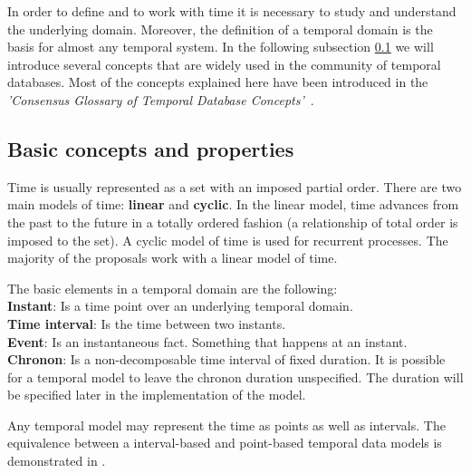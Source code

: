 %
%
In order to define and to work with time it is necessary to study and understand the underlying domain. Moreover, the definition of a temporal domain is the basis for almost any temporal system. In the following subsection \ref{subsec:basic-concepts} we will introduce several concepts that are widely used in the community of temporal databases. Most of the concepts explained here have been introduced in the \emph{'Consensus Glossary of Temporal Database Concepts'}~\cite{Dyreson:1994:CGT:181550.181560}.



\subsection{Basic concepts and properties}
\label{subsec:basic-concepts}

Time is usually represented as a set with an imposed partial order. There are two main models of time: \textbf{linear} and \textbf{cyclic}. In the linear model, time advances from the past to the future in a totally ordered fashion (a relationship of total order is imposed to the set). A cyclic model of time is used for recurrent processes. The majority of the proposals work with a linear model of time.

\begin{svgraybox}
The basic elements in a temporal domain are the following:\\
\textbf{Instant}:  Is a time point over an underlying temporal domain.\\
\textbf{Time interval}: Is the time between two instants.\\
\textbf{Event}: Is an instantaneous fact. Something that happens at an instant.\\
\textbf{Chronon}: Is a non-decomposable time interval of fixed duration. It is possible for a temporal model to leave the chronon duration unspecified. The duration will be specified later in the implementation of the model.
\end{svgraybox}
Any temporal model may represent the time as points as well as intervals. The equivalence between a interval-based and point-based temporal data models is demonstrated in \cite{Böhlen_point-versus}.

